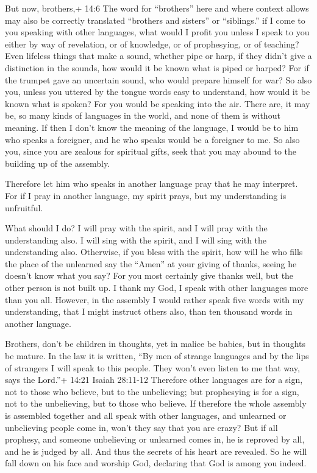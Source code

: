  But now, brothers,+ 14:6 The word for ``brothers'' here and
where context allows may also be correctly translated ``brothers and
sisters'' or ``siblings.'' if I come to you speaking with other
languages, what would I profit you unless I speak to you either by way
of revelation, or of knowledge, or of prophesying, or of teaching?
 Even lifeless things that make a sound, whether pipe or
harp, if they didn't give a distinction in the sounds, how would it be
known what is piped or harped?  For if the trumpet gave an
uncertain sound, who would prepare himself for war?  So also
you, unless you uttered by the tongue words easy to understand, how
would it be known what is spoken? For you would be speaking into the
air.  There are, it may be, so many kinds of languages in
the world, and none of them is without meaning.  If then I
don't know the meaning of the language, I would be to him who speaks a
foreigner, and he who speaks would be a foreigner to me. 
So also you, since you are zealous for spiritual gifts, seek that you
may abound to the building up of the assembly.

 Therefore let him who speaks in another language pray that
he may interpret.  For if I pray in another language, my
spirit prays, but my understanding is unfruitful.

 What should I do? I will pray with the spirit, and I will
pray with the understanding also. I will sing with the spirit, and I
will sing with the understanding also.  Otherwise, if you
bless with the spirit, how will he who fills the place of the unlearned
say the ``Amen'' at your giving of thanks, seeing he doesn't know what
you say?  For you most certainly give thanks well, but the
other person is not built up.  I thank my God, I speak with
other languages more than you all.  However, in the
assembly I would rather speak five words with my understanding, that I
might instruct others also, than ten thousand words in another language.

 Brothers, don't be children in thoughts, yet in malice be
babies, but in thoughts be mature.  In the law it is
written, ``By men of strange languages and by the lips of strangers I
will speak to this people. They won't even listen to me that way, says
the Lord.''+ 14:21 Isaiah 28:11-12  Therefore other
languages are for a sign, not to those who believe, but to the
unbelieving; but prophesying is for a sign, not to the unbelieving, but
to those who believe.  If therefore the whole assembly is
assembled together and all speak with other languages, and unlearned or
unbelieving people come in, won't they say that you are crazy?
 But if all prophesy, and someone unbelieving or unlearned
comes in, he is reproved by all, and he is judged by all. 
And thus the secrets of his heart are revealed. So he will fall down on
his face and worship God, declaring that God is among you indeed.

